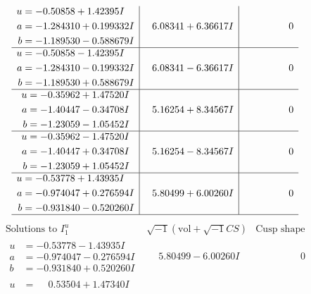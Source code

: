 \documentclass[1p]{elsarticle_modified}
\theoremstyle{definition}
\newcommand{\I}{\sqrt{-1}}
\begin{document}
$$\begin{array}{c|c|c}
\begin{aligned}
u &= -0.50858 + 1.42395 I \\
a &= -1.284310 + 0.199332 I \\
b &= -1.189530 - 0.588679 I\end{aligned}
 & \phantom{-}6.08341 + 6.36617 I & \phantom{-0.000000 } 0 \\ \hline\begin{aligned}
u &= -0.50858 - 1.42395 I \\
a &= -1.284310 - 0.199332 I \\
b &= -1.189530 + 0.588679 I\end{aligned}
 & \phantom{-}6.08341 - 6.36617 I & \phantom{-0.000000 } 0 \\ \hline\begin{aligned}
u &= -0.35962 + 1.47520 I \\
a &= -1.40447 - 0.34708 I \\
b &= -1.23059 - 1.05452 I\end{aligned}
 & \phantom{-}5.16254 + 8.34567 I & \phantom{-0.000000 } 0 \\ \hline\begin{aligned}
u &= -0.35962 - 1.47520 I \\
a &= -1.40447 + 0.34708 I \\
b &= -1.23059 + 1.05452 I\end{aligned}
 & \phantom{-}5.16254 - 8.34567 I & \phantom{-0.000000 } 0 \\ \hline\begin{aligned}
u &= -0.53778 + 1.43935 I \\
a &= -0.974047 + 0.276594 I \\
b &= -0.931840 - 0.520260 I\end{aligned}
 & \phantom{-}5.80499 + 6.00260 I & \phantom{-0.000000 } 0\\
 \hline 
 \end{array}$$\newpage$$\begin{array}{c|c|c}  
\text{Solutions to }I^u_{1}& \I (\text{vol} + \sqrt{-1}CS) & \text{Cusp shape}\\
 \hline 
\begin{aligned}
u &= -0.53778 - 1.43935 I \\
a &= -0.974047 - 0.276594 I \\
b &= -0.931840 + 0.520260 I\end{aligned}
 & \phantom{-}5.80499 - 6.00260 I & \phantom{-0.000000 } 0 \\ \hline\begin{aligned}
u &= \phantom{-}0.53504 + 1.47340 I \\

\end{aligned}
\end{array}$$
\end{document}

